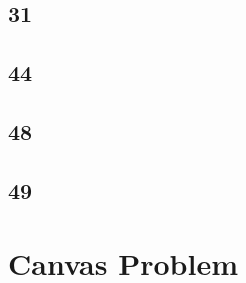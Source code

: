 \documentclass[12pt]{article}
\begin{document}
\subsection*{31}

\subsection*{44}

\subsection*{48}

\subsection*{49}

\section*{Canvas Problem}
\end{document}
